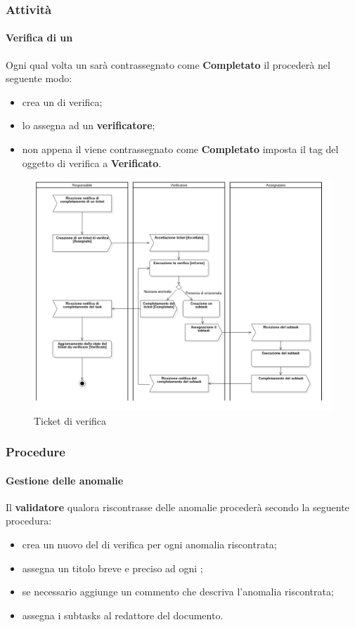 \subsubsection{Attività}
	\paragraph{Verifica di un }
	Ogni qual volta un  sarà contrassegnato come \textbf{Completato} il \RES procederà nel seguente modo: 
	\begin{itemize}
		\item crea un  di verifica;
		\item lo assegna ad un \textbf{verificatore};
		\item non appena il  viene contrassegnato come \textbf{Completato} imposta il tag del  oggetto di verifica a \textbf{Verificato}.
	\end{itemize}
	\begin{figure}
		\centering
		\includegraphics[scale=0.40]{img/ticketVerifica.png}
		\caption{Ticket di verifica}
	\end{figure}
\subsubsection{Procedure}
	\paragraph{Gestione delle anomalie}
			Il \textbf{validatore} qualora riscontrasse delle anomalie procederà secondo la seguente procedura:
			\begin{itemize}
				\item crea un nuovo  del  di verifica per ogni anomalia riscontrata;
				\item assegna un titolo breve e preciso ad ogni ;
				\item se necessario aggiunge un commento che descriva l'anomalia riscontrata;
				\item assegna i subtasks al redattore del documento.
			\end{itemize}
